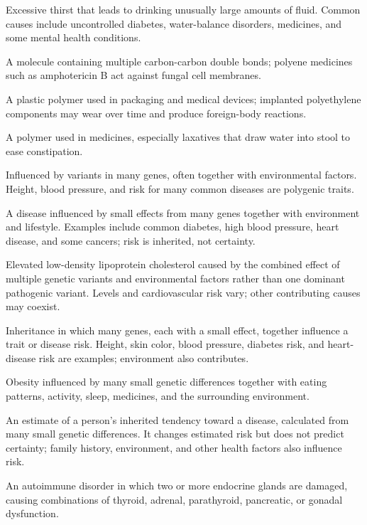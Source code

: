  Excessive thirst that leads to drinking unusually large amounts of fluid. Common causes include uncontrolled diabetes, water-balance disorders, medicines, and some mental health conditions.

 A molecule containing multiple carbon-carbon double bonds; polyene medicines such as amphotericin B act against fungal cell membranes.

 A plastic polymer used in packaging and medical devices; implanted polyethylene components may wear over time and produce foreign-body reactions.

 A polymer used in medicines, especially laxatives that draw water into stool to ease constipation.

 Influenced by variants in many genes, often together with environmental factors. Height, blood pressure, and risk for many common diseases are polygenic traits.

 A disease influenced by small effects from many genes together with environment and lifestyle. Examples include common diabetes, high blood pressure, heart disease, and some cancers; risk is inherited, not certainty.

 Elevated low-density lipoprotein cholesterol caused by the combined effect of multiple genetic variants and environmental factors rather than one dominant pathogenic variant. Levels and cardiovascular risk vary; other contributing causes may coexist.

 Inheritance in which many genes, each with a small effect, together influence a trait or disease risk. Height, skin color, blood pressure, diabetes risk, and heart-disease risk are examples; environment also contributes.

 Obesity influenced by many small genetic differences together with eating patterns, activity, sleep, medicines, and the surrounding environment.

 An estimate of a person’s inherited tendency toward a disease, calculated from many small genetic differences. It changes estimated risk but does not predict certainty; family history, environment, and other health factors also influence risk.

 An autoimmune disorder in which two or more endocrine glands are damaged, causing combinations of thyroid, adrenal, parathyroid, pancreatic, or gonadal dysfunction.

